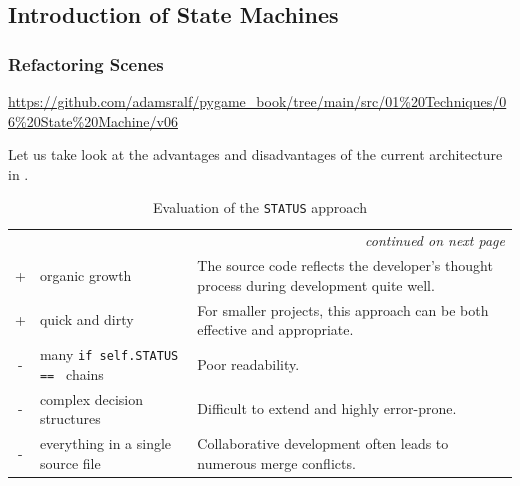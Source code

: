 

\subsection{Introduction of State Machines}

\subsubsection{Refactoring Scenes}
\begin{diskbox}
	\url{https://github.com/adamsralf/pygame_book/tree/main/src/01%20Techniques/06%20State%20Machine/v06}
\end{diskbox}

Let us take look at the advantages and disadvantages of the current architecture in .


\begin{longtable}{clp{7.7cm}}
	\caption{Evaluation of the \texttt{STATUS} approach}\label{tabStatusApproach}\\
	\toprule
	\endfirsthead
	
	\toprule
	\endhead
	
	\midrule
	\multicolumn{3}{r}{\emph{continued on next page}} \\
	\endfoot
	
	\bottomrule
	\endlastfoot
	
	\rowcolor{green!20}+ & organic growth & The source code reflects the developer's thought process during development quite well. \\ \midrule
	\rowcolor{green!20}+ & quick and dirty & For smaller projects, this approach can be both effective and appropriate. \\ \midrule
	\rowcolor{red!20}- & many \texttt{if self.STATUS == } chains & Poor readability. \\ \midrule
	\rowcolor{red!20}- & complex decision structures & Difficult to extend and highly error-prone. \\  \midrule
	\rowcolor{red!20}- & everything in a single source file & Collaborative development often leads to numerous merge conflicts. \\
\end{longtable}


